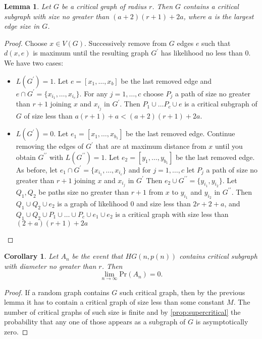\documentclass[11pt,notitlepage,a4paper]{article}
\newtheorem{lemma}{Lemma}[section]
\newtheorem{corollary}{Corollary}[section]
\theoremstyle{definition}
\newcommand{\Ln}{\lim\limits_{n\to \infty}}
\begin{document}
\begin{lemma}
	Let $G$ be a critical graph of radius $r$.
	Then $G$ contains a critical subgraph with size no greater than
	$(a+2)(r+1)+2a$, where $a$ is the largest edge size in $G$. 
\end{lemma}
\begin{proof}
	Choose $x\in V(G)$. Successively remove from $G$ edges $e$
	such that $d(x, e)$ is maximum until the resulting graph 
	$G^\prime$ has likelihood no less than $0$. We have two cases:
	\begin{itemize}[leftmargin=*]
		\item $L(G^\prime)=1$. Let $e=[x_1, \dots, x_b]$ be
		the last removed edge and
		$e\cap G^\prime=\{ x_{i_1}, \dots, x_{i_c}\}$.
		For any $j=1,\dots, c$ choose 
		$P_j$ a path of size no greater than $r+1$ joining
		$x$ and $x_{i_j}$ in $G^\prime$.   
		Then $P_1\cup \dots P_c \cup e$ is a critical subgraph of $G$
		of size less than $a(r+1) + a< (a+2)(r+1) + 2a$.
		\item $L(G^\prime)=0$. Let $e_1=[x_1, \dots, x_{b_1}]$ be the
		last removed edge. Continue removing the edges of $G^\prime$ 
		that are at maximum distance from $x$ until you obtain 
		$G^{\prime \prime}$ with $L(G^{\prime\prime})=1$. Let 
		$e_2=[y_1, \dots, y_{b_1}]$ be the last removed edge.
		As before, let $e_1\cap G^\prime=\{ x_{i_1}, \dots, x_{i_c}\}$
		and for $j=1,\dots, c$ let $P_j$ a path of size no greater than $r+1$ 
		joining	$x$ and $x_{i_j}$ in $G^\prime$
		Then $e_2 \cup G^{\prime \prime}=\{ y_{i_1}, y_{i_2}  \}$.
		Let $Q_1, Q_2$ be paths size no greater than $r+1$ from
		$x$ to $y_{i_1}$ and $y_{i_2}$ in $G^{\prime \prime}$.
		Then $Q_1 \cup Q_2 \cup e_2$ is a graph of likelihood $0$ 
		and size less than $2r+2 + a$,
		and $Q_1\cup Q_2\cup P_1 \cup \dots \cup P_c \cup e_1 \cup e_2$ 
		is a critical graph	with size less than $(2+a)(r+1) + 2a$	
	\end{itemize} 
\end{proof}


\begin{corollary}
	Let $A_n$ be the event that $HG(n,p(n))$ contains critical 
	subgraph with diameter no greater than $r$. Then
	\[ \Ln \mathrm{Pr}(A_n)=0. \]
\end{corollary}
\begin{proof}
	If a random graph contains $G$ such critical graph, then by the previous
	lemma it has to contain a critical graph of size less than some constant $M$.
	The number of critical graphs of such size is finite and by
	\cref{prop:supercritical} the probability 
	that any one of those appears as a subgraph of $G$ is asymptotically zero.	 
\end{proof}
\end{document}

